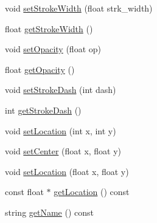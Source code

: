 \begin{DoxyCompactItemize}
\item 
void \hyperlink{classbridges_1_1datastructure_1_1_symbol_a56238a4535a26bc3eea698eea4b65921}{set\+Stroke\+Width} (float strk\+\_\+width)
\item 
float \hyperlink{classbridges_1_1datastructure_1_1_symbol_a4274feed56b8dfe89ffa3f791ece2ebd}{get\+Stroke\+Width} ()
\item 
void \hyperlink{classbridges_1_1datastructure_1_1_symbol_a889bace56d39df0ac09ba408ca868b7d}{set\+Opacity} (float op)
\item 
float \hyperlink{classbridges_1_1datastructure_1_1_symbol_af77f6e4c42ca97672888d863335b851a}{get\+Opacity} ()
\item 
void \hyperlink{classbridges_1_1datastructure_1_1_symbol_afd39d3b65d22bc2a1be64c8728f5e5d7}{set\+Stroke\+Dash} (int dash)
\item 
int \hyperlink{classbridges_1_1datastructure_1_1_symbol_a5fd32d1310c9ef97b07acab8efb17808}{get\+Stroke\+Dash} ()
\item 
void \hyperlink{classbridges_1_1datastructure_1_1_symbol_a9c62675b598fc5e755721576852f2dcf}{set\+Location} (int x, int y)
\item 
void \hyperlink{classbridges_1_1datastructure_1_1_symbol_a98a1c3d133e7fe2150d933495e421760}{set\+Center} (float x, float y)
\item 
void \hyperlink{classbridges_1_1datastructure_1_1_symbol_a4dbf51dac8b22b293a7061f5eb84b460}{set\+Location} (float x, float y)
\item 
const float $\ast$ \hyperlink{classbridges_1_1datastructure_1_1_symbol_a6ab847b892f510e185f2aebb9302bc82}{get\+Location} () const
\item 
string \hyperlink{classbridges_1_1datastructure_1_1_symbol_a9365f8d91faf67e14ceaa89f8a5d0338}{get\+Name} () const
\end{DoxyCompactItemize}
